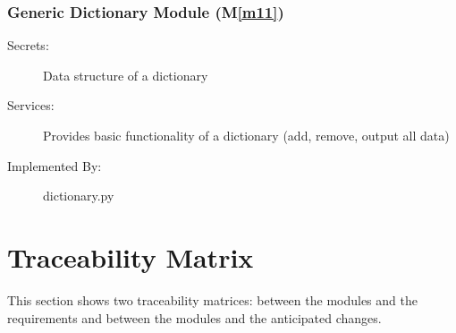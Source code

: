 \documentclass[12pt, titlepage]{article}
\newcommand{\mref}[1]{M\ref{#1}}
\begin{document}
\subsubsection{Generic Dictionary Module (\mref{m11})}
\begin{description}
    \item[Secrets:] Data structure of a dictionary
    \item[Services:] Provides basic functionality of a dictionary (add, remove, output all data)
    \item[Implemented By:] dictionary.py
\end{description}

\section{Traceability Matrix} \label{SecTM}

This section shows two traceability matrices: between the modules and the
requirements and between the modules and the anticipated changes.
\end{document}
